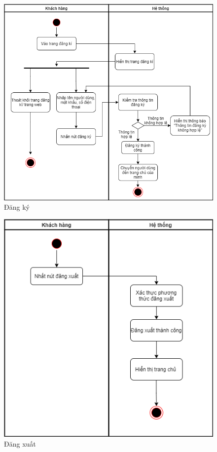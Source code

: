 \begin{figure}[!h]
    \begin{center}
        \includegraphics[scale=0.6]{Images/ActivityDiagram/register.drawio.png}
    \end{center}
    \hspace{0.3cm}
    \caption{Đăng ký}
\end{figure}

\newpage

\begin{figure}[!h]
    \begin{center}
        \includegraphics[scale=0.7]{Images/ActivityDiagram/logout.drawio.png}
    \end{center}
    \hspace{0.3cm}
    \caption{Đăng xuất}
\end{figure}